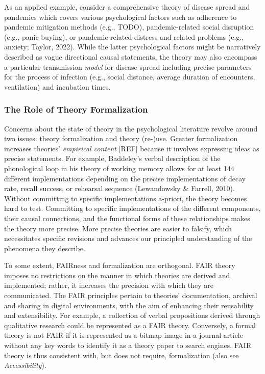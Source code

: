 \documentclass[
  man,floatsintext]{apa6}
\begin{document}
As an applied example, consider a comprehensive theory of disease spread and pandemics which covers various psychological factors such as adherence to pandemic mitigation methods (e.g., TODO), pandemic-related social disruption (e.g., panic buying), or pandemic-related distress and related problems (e.g., anxiety; Taylor, 2022).
While the latter psychological factors might be narratively described as vague directional causal statements,
the theory may also encompass a particular transmission \emph{model} for disease spread including precise parameters for the process of infection (e.g., social distance, average duration of encounters, ventilation) and incubation times.

\subsubsection{The Role of Theory Formalization}\label{the-role-of-theory-formalization}

Concerns about the state of theory in the psychological literature revolve around two issues: theory formalization and theory (re-)use.
Greater formalization increases theories' \emph{empirical content} {[}REF{]} because it involves expressing ideas as precise statements.
For example, Baddeley's verbal description of the phonological loop in his theory of working memory allows for at least 144 different implementations depending on the precise implementations of decay rate, recall success, or rehearsal sequence (Lewandowsky \& Farrell, 2010).
Without committing to specific implementations a-priori,
the theory becomes hard to test.
Committing to specific implementations of the different components, their causal connections, and the functional forms of these relationships makes the theory more precise.
More precise theories are easier to falsify,
which necessitates specific revisions and advances our principled understanding of the phenomena they describe.

To some extent, FAIRness and formalization are orthogonal.
FAIR theory imposes no restrictions on the manner in which theories are derived and implemented;
rather, it increases the precision with which they are communicated.
The FAIR principles pertain to theories' documentation, archival and sharing in digital environments, with the aim of enhancing their reusability and extensibility.
For example, a collection of verbal propositions derived through qualitative research could be represented as a FAIR theory.
Conversely, a formal theory is not FAIR if it is represented as a bitmap image in a journal article without any key words to identify it as a theory paper to search engines.
FAIR theory is thus consistent with, but does not require, formalization (also see \emph{Accessibility}).
\end{document}
